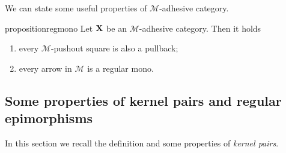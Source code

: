 \documentclass[a4paper,UKenglish,cleveref,pdftex,thm-restate,numberwithinsect]{lipics-v2021}
\def\C{\textbf {\textup{C}}}
\def\X{\textbf {\textup{X}}}
\begin{document}
\iffalse 
\begin{remark}\label{rem:deco}
We can point out an important property of strict $\mathcal{M}$-adhesive categories with pullbacks.  Consider the solid part of the cube aside, whose bottom case is an $\mathcal{M}$-pushout.
	
	\parbox{9.5cm}{	Given an arrow $d\colon X\to D$, we can present the object $X$ has a pushout: indeed, consider the following cube, in which all the three vertical squares are pullbacks.}
	\parbox{3cm}{
	\xymatrix@C=15pt@R=9pt{&V\ar[dd]|\hole_(.65){a}\ar[rr]^{v} \ar@{>.>}[dl]_{u} && Y \ar[dd]^{b} \ar@{>->}[dl]_{y} \\ Z  \ar[dd]_{c}\ar[rr]^(.7){z} & & X \ar[dd]_(.3){d}\\&A\ar[rr]|\hole^(.65){f} \ar@{>->}[dl]^{m} && B \ar@{>->}[dl]^{n} \\C \ar[rr]_{g} & & D }}

Now, notice that, since the front square is a pullback, then the dotted arrow $u\colon V\to Z$ exists. Moreover, the usual composition and decomposition property of pullbacks \cite{mac2013categories} entails that the left face of the cube so obtained is a pullback too, proving that $u$ is in $\mathcal{M}$ and that the top square is a pushout.

	Clearly if the arrow $p\colon X\to D$ is in $\mathcal{M}$, we can omit the assumptions of strictness and the existence of all pullbacks.
\end{remark}
\fi 


We can state some useful properties of $\mathcal{M}$-adhesive category.

\begin{restatable}{proposition}{regmono}\label{prop:regmono}
	Let $\X$ be an $\mathcal{M}$-adhesive category. Then it holds
	\begin{enumerate}
		\item every $\mathcal{M}$-pushout square is also a pullback;
		\item every arrow in $\mathcal{M}$ is a regular mono.
	\end{enumerate}
\end{restatable}


\subsection{Some properties of kernel pairs and regular epimorphisms}

In this section we recall the definition and some properties of \emph{kernel pairs}.
\end{document}
